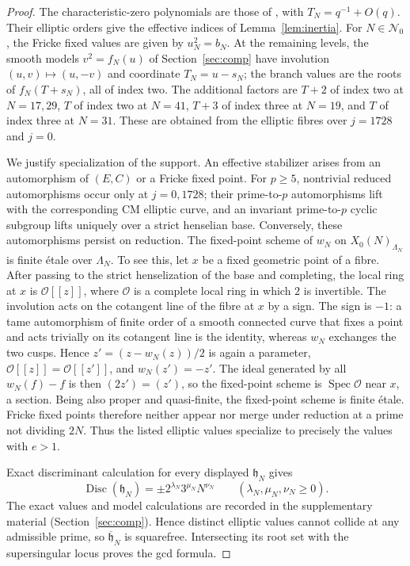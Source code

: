 \documentclass[11pt,a4paper]{article}
\numberwithin{equation}{section}
\theoremstyle{definition}
\theoremstyle{remark}
\begin{document}
\begin{proof}
The characteristic-zero polynomials are those of
\citet[\S4.2, Table~1]{JST19}, with $T_N=q^{-1}+O(q)$.
Their elliptic orders give the effective indices of
Lemma~\ref{lem:inertia}. For $N\in\mathcal N_0$, the Fricke fixed values
are given by $u_N^2=b_N$. At the remaining levels, the smooth models
$v^2=f_N(u)$ of Section~\ref{sec:comp} have involution
$(u,v)\mapsto(u,-v)$ and coordinate $T_N=u-s_N$;
the branch values are the roots of $f_N(T+s_N)$, all of index two.
The additional factors are $T+2$ of index two at $N=17,29$,
$T$ of index two at $N=41$, $T+3$ of index three at $N=19$,
and $T$ of index three at $N=31$. These are obtained from the
elliptic fibres over $j=1728$ and $j=0$.

We justify specialization of the support. An effective stabilizer arises
from an automorphism of $(E,C)$ or a Fricke fixed point. For $p\ge5$,
nontrivial reduced automorphisms occur only at $j=0,1728$; their
prime-to-$p$ automorphisms lift with the corresponding CM elliptic curve,
and an invariant prime-to-$p$ cyclic subgroup lifts uniquely over a
strict henselian base. Conversely, these automorphisms persist on reduction.
The fixed-point scheme of $w_N$ on $X_0(N)_{\Lambda_N}$ is finite
\'etale over $\Lambda_N$. To see this, let $x$ be a fixed geometric point
of a fibre. After passing to the strict henselization of the base and
completing, the local ring at $x$ is $\mathcal O[[z]]$, where $\mathcal O$
is a complete local ring in which $2$ is invertible. The involution acts
on the cotangent line of the fibre at $x$ by a sign. The sign is $-1$: a
tame automorphism of finite order of a smooth connected curve that fixes
a point and acts trivially on its cotangent line is the identity, whereas
$w_N$ exchanges the two cusps. Hence $z'=(z-w_N(z))/2$ is again a
parameter, $\mathcal O[[z]]=\mathcal O[[z']]$, and $w_N(z')=-z'$. The
ideal generated by all $w_N(f)-f$ is then $(2z')=(z')$, so the
fixed-point scheme is $\operatorname{Spec}\mathcal O$ near $x$, a section.
Being also proper and quasi-finite, the fixed-point scheme is finite
\'etale. Fricke fixed points therefore neither appear nor merge under
reduction at a prime not dividing $2N$.
Thus the listed elliptic values specialize to precisely the values with
$e>1$.

Exact discriminant calculation for every displayed $\mathfrak h_N$ gives
\[
\operatorname{Disc}(\mathfrak h_N)=\pm2^{\lambda_N}3^{\mu_N}N^{\nu_N}
\qquad(\lambda_N,\mu_N,\nu_N\ge0).
\]
The exact values and model calculations are recorded in the supplementary
material (Section~\ref{sec:comp}).
Hence distinct elliptic values cannot collide at any admissible prime,
so $\overline{\mathfrak h}_N$ is squarefree. Intersecting its root set with the
supersingular locus proves the gcd formula.
\end{proof}
\end{document}
